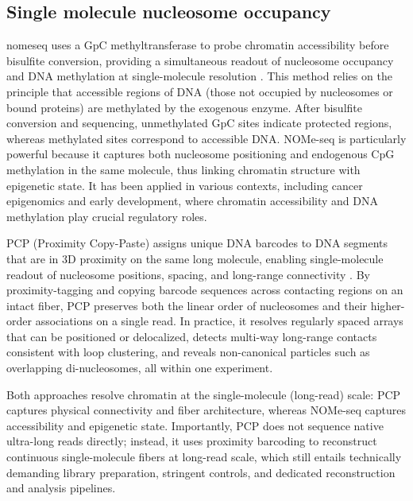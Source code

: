 \documentclass[11pt]{book}
\begin{document}
\subsection{Single molecule nucleosome occupancy}
\gls{nomeseq} uses a GpC methyltransferase to probe chromatin accessibility before bisulfite conversion, providing a simultaneous readout of nucleosome occupancy and DNA methylation at single-molecule resolution \cite{kellyGenomewideMappingNucleosome2012}. This method relies on the principle that accessible regions of DNA (those not occupied by nucleosomes or bound proteins) are methylated by the exogenous enzyme. After bisulfite conversion and sequencing, unmethylated GpC sites indicate protected regions, whereas methylated sites correspond to accessible DNA.
NOMe-seq is particularly powerful because it captures both nucleosome positioning and endogenous CpG methylation in the same molecule, thus linking chromatin structure with epigenetic state. It has been applied in various contexts, including cancer epigenomics and early development, where chromatin accessibility and DNA methylation play crucial regulatory roles.

PCP (Proximity Copy-Paste) assigns unique DNA barcodes to DNA segments that are in 3D proximity on the same long molecule, enabling single-molecule readout of nucleosome positions, spacing, and long-range connectivity \cite{delamarre_chromatin_2025}. By proximity-tagging and copying barcode sequences across contacting regions on an intact fiber, PCP preserves both the linear order of nucleosomes and their higher-order associations on a single read. 
In practice, it resolves regularly spaced arrays that can be positioned or delocalized, detects multi-way long-range contacts consistent with loop clustering, and reveals non-canonical particles such as overlapping di-nucleosomes, all within one experiment.

Both approaches resolve chromatin at the single-molecule (long-read) scale: PCP captures physical connectivity and fiber architecture, whereas NOMe-seq captures accessibility and epigenetic state. 
Importantly, PCP does not sequence native ultra-long reads directly; instead, it uses proximity barcoding to reconstruct continuous single-molecule fibers at long-read scale, which still entails technically demanding library preparation, stringent controls, and dedicated reconstruction and analysis pipelines.
\end{document}
